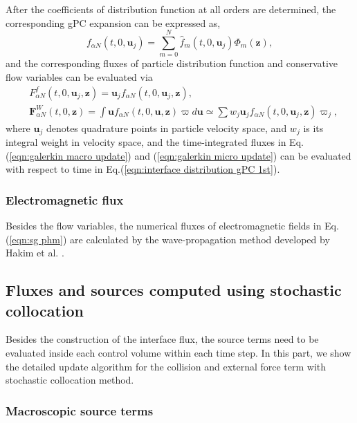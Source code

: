 \documentclass[preprint,3p,12pt,sort&compress]{elsarticle}
\begin{document}
After the coefficients of distribution function at all orders are determined, the corresponding gPC expansion can be expressed as,
\begin{equation}
f_{\alpha N}(t,0,\mathbf u_j) = \sum_{m=0}^N \hat f_{m}(t,0,\mathbf u_j) \Phi_m(\mathbf z) , 
\end{equation}
and the corresponding fluxes of particle distribution function and conservative flow variables can be evaluated via
\begin{equation}
\begin{aligned}
&{{F}}_{\alpha N}^f(t,0,\mathbf u_j,\mathbf z)= \mathbf u_j f_{\alpha N}(t,0,\mathbf u_j,\mathbf z) , \\
&{\mathbf{F}}_{\alpha N}^W(t,0,\mathbf z)=\int \mathbf u f_{\alpha N}(t,0,\mathbf u,\mathbf z) \varpi d\mathbf u \simeq \sum w_j \mathbf u_j f_{\alpha N}(t,0,\mathbf u_j,\mathbf z) \varpi_j  ,
\end{aligned}
\end{equation}
where $\mathbf u_j$ denotes quadrature points in particle velocity space, and $w_j$ is its integral weight in velocity space,
and the time-integrated fluxes in Eq.(\ref{eqn:galerkin macro update}) and (\ref{eqn:galerkin micro update}) can be evaluated with respect to time in Eq.(\ref{eqn:interface distribution gPC 1st}).

\subsubsection{Electromagnetic flux}

Besides the flow variables, the numerical fluxes of electromagnetic fields in Eq.(\ref{eqn:sg phm}) are calculated by the wave-propagation method developed by Hakim et al. \cite{hakim2006high}.

\subsection{Fluxes and sources computed using stochastic collocation} \label{sec:sc treatment}

Besides the construction of the interface flux, the source terms need to be evaluated inside each control volume within each time step. 
In this part, we show the detailed update algorithm for the collision and external force term with stochastic collocation method.

\subsubsection{Macroscopic source terms}
\end{document}
